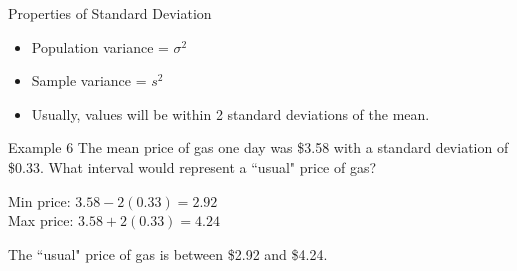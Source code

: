\documentclass[t]{beamer}
\begin{document}
\begin{frame}{Properties of Standard Deviation}
\begin{itemize}
	\item Population variance = $\sigma^2$	\newline\\	\pause
	\item Sample variance = $s^2$	\newline\\	\pause
	\item Usually, values will be within 2 standard deviations of the mean.
\end{itemize}
\end{frame}

\begin{frame}{Example 6}
The mean price of gas one day was \$3.58 with a standard deviation of \$0.33. What interval would represent a ``usual" price of gas?	\newline\\	\pause

Min price: $3.58 - 2(0.33) = 2.92$	\newline\\	\pause
Max price: $3.58 + 2(0.33) = 4.24$	\newline\\	\pause

The ``usual" price of gas is between \$2.92 and \$4.24.
\end{frame}
\end{document}
